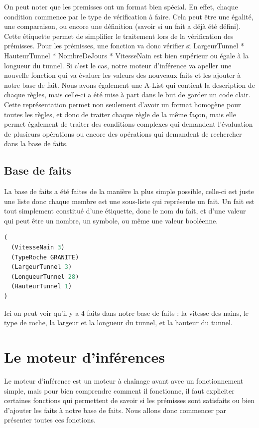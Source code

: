 \documentclass[a4paper,10pt]{report}
\begin{document}
    On peut noter que les premisses ont un format bien spécial. En effet, chaque condition commence par le type de vérification à faire. Cela peut être une égalité,
    une comparaison, ou encore une définition (savoir si un fait a déjà été défini). Cette étiquette permet de simplifier le traitement lors de la vérification
    des prémisses. Pour les prémisses, une fonction va donc vérifier si LargeurTunnel * HauteurTunnel * NombreDeJours * VitesseNain est bien supérieur ou égale à la
    longueur du tunnel. Si c'est le cas, notre moteur d'inférence va apeller une nouvelle fonction qui va évaluer les valeurs des nouveaux faits et les ajouter à
    notre base de fait. Nous avons également une A-List qui contient la description de chaque règles, mais celle-ci a été mise à part dans le but de garder un code
    clair. Cette représentation permet non seulement d'avoir un format homogène pour toutes les règles, et donc de traiter chaque règle de la même façon, mais elle
    permet également de traiter des conditions complexes qui demandent l'évaluation de plusieurs opérations ou encore des opérations qui demandent de rechercher
    dans la base de faits.

    \subsection{Base de faits}
      La base de faits a été faites de la manière la plus simple possible, celle-ci est juste une liste donc chaque membre est une sous-liste qui représente un fait.
      Un fait est tout simplement constitué d'une étiquette, donc le nom du fait, et d'une valeur qui peut être un nombre, un symbole, ou même une valeur booléenne.
      \begin{lstlisting}[language=Lisp]
(
  (VitesseNain 3)
  (TypeRoche GRANITE)
  (LargeurTunnel 3)
  (LongueurTunnel 28)
  (HauteurTunnel 1)
)
      \end{lstlisting}
      Ici on peut voir qu'il y a 4 faits dans notre base de faits : la vitesse des nains, le type de roche, la largeur et la longueur du tunnel, et la hauteur du tunnel.
  \section{Le moteur d'inférences}
  Le moteur d'inférence est un moteur à chaînage avant avec un fonctionnement simple, mais pour bien comprendre comment il fonctionne, il faut expliciter certaines
  fonctions qui permettent de savoir si les prémisses sont satisfaits ou bien d'ajouter les faits à notre base de faits. Nous allons donc commencer par présenter
  toutes ces fonctions.\newpage
\end{document}
